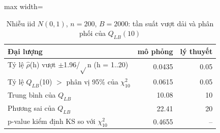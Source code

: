 \begin{table}[H]
\centering\small
\caption{Nhiễu iid $N(0,1)$, $n=200$, $B=2000$: tần suất vượt dải và phân phối của $Q_{LB}(10)$}\label{tab:tab_b11_04_simulation}
\begin{adjustbox}{max width=\linewidth}
\begin{tabular}{>{\raggedright\arraybackslash}p{}rr}
\toprule
Đại lượng & mô phỏng & lý thuyết \\
\midrule
Tỷ lệ \textbar{}$\hat{\rho}$(h)\textbar{} vượt $\pm$1.96/$\sqrt{}$n (h = 1..20) & 0.0435 & 0.05 \\
Tỷ lệ $Q_{LB}$(10) $>$ phân vị 95\% của $\chi^{2}_{10}$ & 0.0615 & 0.05 \\
Trung bình của $Q_{LB}$ & 10.08 & 10 \\
Phương sai của $Q_{LB}$ & 22.41 & 20 \\
p-value kiểm định KS so với $\chi^{2}_{10}$ & 0.4655 & – \\
\bottomrule
\end{tabular}
\end{adjustbox}
\end{table}
